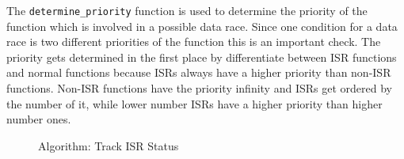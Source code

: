 \documentclass[
fancyheadings, %
%
%
]{stsreprt}
\begin{document}
{		The \texttt{determine\_priority} function is used to determine the priority of the function which is involved in a possible data race. Since one condition for a data race is two different priorities of the function this is an important check. The priority gets determined in the first place by differentiate between \ac{ISR} functions and normal functions because \acp{ISR} always have a higher priority than non-\ac{ISR} functions. Non-\Ac{ISR} functions have the priority infinity and \acp{ISR} get ordered by the number of it, while lower number \acp{ISR} have a higher priority than higher number ones.
		
		\begin{figure}[H]
			\centering
			\caption{Algorithm: Track ISR Status}
		\end{figure} 
		
		\begin{figure}[H]
			\centering
\end{figure}}
\end{document}
